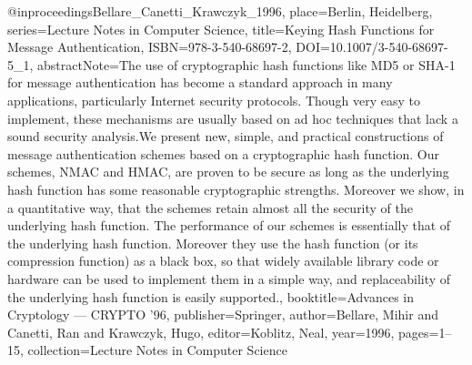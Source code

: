  @inproceedings{Bellare_Canetti_Krawczyk_1996, place={Berlin, Heidelberg}, series={Lecture Notes in Computer Science}, title={Keying Hash Functions for Message Authentication}, ISBN={978-3-540-68697-2}, DOI={10.1007/3-540-68697-5_1}, abstractNote={The use of cryptographic hash functions like MD5 or SHA-1 for message authentication has become a standard approach in many applications, particularly Internet security protocols. Though very easy to implement, these mechanisms are usually based on ad hoc techniques that lack a sound security analysis.We present new, simple, and practical constructions of message authentication schemes based on a cryptographic hash function. Our schemes, NMAC and HMAC, are proven to be secure as long as the underlying hash function has some reasonable cryptographic strengths. Moreover we show, in a quantitative way, that the schemes retain almost all the security of the underlying hash function. The performance of our schemes is essentially that of the underlying hash function. Moreover they use the hash function (or its compression function) as a black box, so that widely available library code or hardware can be used to implement them in a simple way, and replaceability of the underlying hash function is easily supported.}, booktitle={Advances in Cryptology — CRYPTO ’96}, publisher={Springer}, author={Bellare, Mihir and Canetti, Ran and Krawczyk, Hugo}, editor={Koblitz, Neal}, year={1996}, pages={1–15}, collection={Lecture Notes in Computer Science} }
